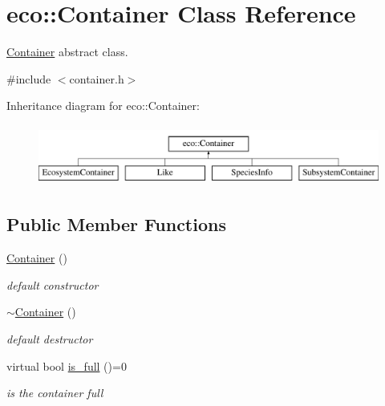 \hypertarget{classeco_1_1Container}{
\section{eco::Container Class Reference}
\label{classeco_1_1Container}
}


\hyperlink{classeco_1_1Container}{Container} abstract class.  




{\ttfamily \#include $<$container.h$>$}

Inheritance diagram for eco::Container:\begin{figure}[H]
\begin{center}
\leavevmode
\includegraphics[height=2.000000cm]{classeco_1_1Container}
\end{center}
\end{figure}
\subsection*{Public Member Functions}
\begin{DoxyCompactItemize}
\item 
\hypertarget{classeco_1_1Container_a1b0c5515d6863c1bc98cc93b65952f42}{
\hyperlink{classeco_1_1Container_a1b0c5515d6863c1bc98cc93b65952f42}{Container} ()}
\label{classeco_1_1Container_a1b0c5515d6863c1bc98cc93b65952f42}

\begin{DoxyCompactList}\small\item\em default constructor \end{DoxyCompactList}\item 
\hypertarget{classeco_1_1Container_ae9f5d07bfc3defda274aa06091c19f56}{
\hyperlink{classeco_1_1Container_ae9f5d07bfc3defda274aa06091c19f56}{$\sim$Container} ()}
\label{classeco_1_1Container_ae9f5d07bfc3defda274aa06091c19f56}

\begin{DoxyCompactList}\small\item\em default destructor \end{DoxyCompactList}\item 
virtual bool \hyperlink{classeco_1_1Container_aaba4667933eb47147b319f6daa7da5c2}{is\_\-full} ()=0
\begin{DoxyCompactList}\small\item\em is the container full \end{DoxyCompactList}\end{DoxyCompactItemize}


